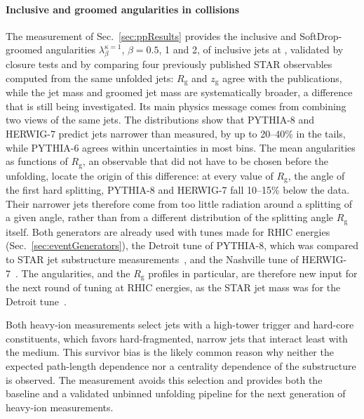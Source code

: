 \paragraph{Inclusive and groomed angularities in \pp collisions}
The \pp measurement of Sec.~\ref{sec:ppResults} provides the inclusive and SoftDrop-groomed angularities \(\lambda^{\kappa=1}_{\beta}\), \(\beta = 0.5\), 1 and 2, of inclusive jets at , validated by closure tests and by comparing four previously published STAR observables computed from the same unfolded jets: \(R_\mathrm{g}\) and \(z_\mathrm{g}\) agree with the publications, while the jet mass and groomed jet mass are systematically broader, a difference that is still being investigated.
%
Its main physics message comes from combining two views of the same jets.
%
The distributions show that PYTHIA\mbox{-}8 and HERWIG\mbox{-}7 predict jets narrower than measured, by up to 20--40\% in the tails, while PYTHIA\mbox{-}6 agrees within uncertainties in most bins.
%
The mean angularities as functions of \(R_\mathrm{g}\), an observable that did not have to be chosen before the unfolding, locate the origin of this difference: at every value of \(R_\mathrm{g}\), the angle of the first hard splitting, PYTHIA\mbox{-}8 and HERWIG\mbox{-}7 fall 10--15\% below the data.
%
Their narrower jets therefore come from too little radiation around a splitting of a given angle, rather than from a different distribution of the splitting angle \(R_\mathrm{g}\) itself.
%
Both generators are already used with tunes made for RHIC energies (Sec.~\ref{sec:eventGenerators}), the Detroit tune of PYTHIA\mbox{-}8, which was compared to STAR jet substructure measurements~\cite{PhysRevD.105.016011}, and the Nashville tune of HERWIG\mbox{-}7~\cite{Qureshi:2024eqz}.
%
The angularities, and the \(R_\mathrm{g}\) profiles in particular, are therefore new input for the next round of tuning at RHIC energies, as the STAR jet mass was for the Detroit tune~\cite{Mooney:2022thesis}.

Both heavy-ion measurements select jets with a high-tower trigger and hard-core constituents, which favors hard-fragmented, narrow jets that interact least with the medium.
%
This survivor bias is the likely common reason why neither the expected path-length dependence nor a centrality dependence of the substructure is observed.
%
The \pp measurement avoids this selection and provides both the baseline and a validated unbinned unfolding pipeline for the next generation of heavy-ion measurements.

